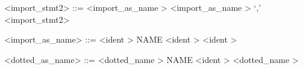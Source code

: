 \label{importzzzstmt2b}

\begin{grammar}
<import_stmt2> ::= <import_as_name \myref[importzzzaszzznameb]>
	\alt <import_as_name \myref[importzzzaszzznameb]> `,' <import_stmt2>
\end{grammar}


\label{importzzzaszzznameb}

\begin{grammar}
<import_as_name> ::= <ident \myref[identb]> NAME <ident \myref[identb]>
	\alt <ident \myref[identb]>
\end{grammar}


\label{dottedzzzaszzznameb}

\begin{grammar}
<dotted_as_name> ::= <dotted_name \myref[dottedzzznameb]> NAME <ident \myref[identb]>
	\alt <dotted_name \myref[dottedzzznameb]>
\end{grammar}


\label{dottedzzznameb}

